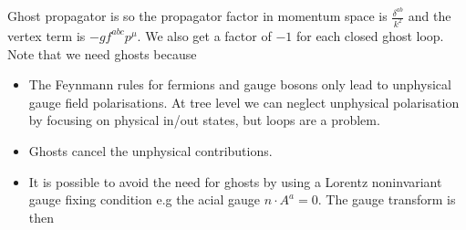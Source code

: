 \documentclass{article}
\begin{document}
Ghost propagator is 
so the propagator factor in momentum space is $\frac{\delta^{ab}}{k^2}$ and the vertex term is $-gf^{abc}p^\mu$. We also get a factor of $-1$ for each closed ghost loop. \\
Note that we need ghosts because 
\begin{itemize}
    \item The Feynmann rules for fermions and gauge bosons only lead to unphysical gauge field polarisations. At tree level we can neglect unphysical polarisation by focusing on physical in/out states, but loops are a problem.
    \item Ghosts cancel the unphysical contributions.
    \item It is possible to avoid the need for ghosts by using a Lorentz noninvariant gauge fixing condition e.g the acial gauge $n \cdot A^a = 0$. The gauge transform is then 
\end{itemize}

\end{document}
